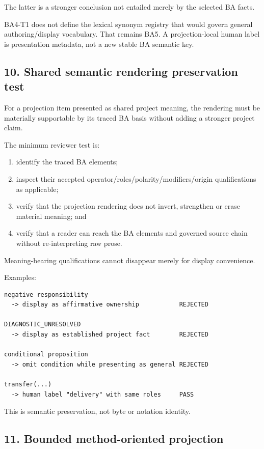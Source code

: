 \documentclass[11pt,a4paper]{article}
\providecommand{\tightlist}{\setlength{\itemsep}{0pt}\setlength{\parskip}{0pt}}
\begin{document}
The latter is a stronger conclusion not entailed merely by the selected BA facts.

BA4-T1 does not define the lexical synonym registry that would govern general authoring/display vocabulary. That remains BA5. A projection-local human label is presentation metadata, not a new stable BA semantic key.

\subsection{10. Shared semantic rendering preservation test}\label{10-shared-semantic-rendering-preservation-test}

For a projection item presented as shared project meaning, the rendering must be materially supportable by its traced BA basis without adding a stronger project claim.

The minimum reviewer test is:

\begin{enumerate}
\def\labelenumi{\arabic{enumi}.}
\tightlist
\item
  identify the traced BA elements;
\item
  inspect their accepted operator/roles/polarity/modifiers/origin qualifications as applicable;
\item
  verify that the projection rendering does not invert, strengthen or erase material meaning; and
\item
  verify that a reader can reach the BA elements and governed source chain without re-interpreting raw prose.
\end{enumerate}

Meaning-bearing qualifications cannot disappear merely for display convenience.

Examples:

\begin{verbatim}
negative responsibility
  -> display as affirmative ownership           REJECTED

DIAGNOSTIC_UNRESOLVED
  -> display as established project fact        REJECTED

conditional proposition
  -> omit condition while presenting as general REJECTED

transfer(...)
  -> human label "delivery" with same roles     PASS
\end{verbatim}

This is semantic preservation, not byte or notation identity.

\subsection{11. Bounded method-oriented projection}\label{11-bounded-method-oriented-projection}
\end{document}
